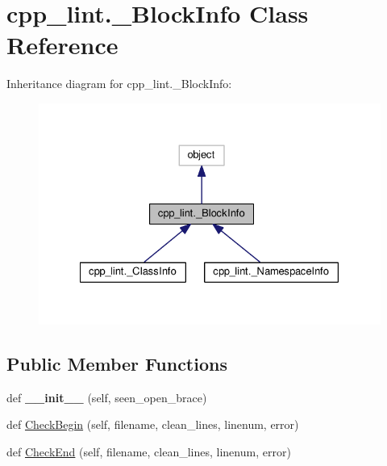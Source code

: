\hypertarget{classcpp__lint_1_1___block_info}{}\section{cpp\+\_\+lint.\+\_\+\+Block\+Info Class Reference}
\label{classcpp__lint_1_1___block_info}


Inheritance diagram for cpp\+\_\+lint.\+\_\+\+Block\+Info\+:
\nopagebreak
\begin{figure}[H]
\begin{center}
\leavevmode
\includegraphics[width=328pt]{classcpp__lint_1_1___block_info__inherit__graph}
\end{center}
\end{figure}
\subsection*{Public Member Functions}
\begin{DoxyCompactItemize}
\item 
\mbox{\label{classcpp__lint_1_1___block_info_a32861c4229ec1a33e077b77a63d5e619}} 
def {\bfseries \+\_\+\+\_\+init\+\_\+\+\_\+} (self, seen\+\_\+open\+\_\+brace)
\item 
def \mbox{\hyperlink{classcpp__lint_1_1___block_info_a69357fb2efabae1dd77aab9942b90560}{Check\+Begin}} (self, filename, clean\+\_\+lines, linenum, error)
\item 
def \mbox{\hyperlink{classcpp__lint_1_1___block_info_abc44459ea5e04d6a9a4d816e85998bfc}{Check\+End}} (self, filename, clean\+\_\+lines, linenum, error)
\end{DoxyCompactItemize}
